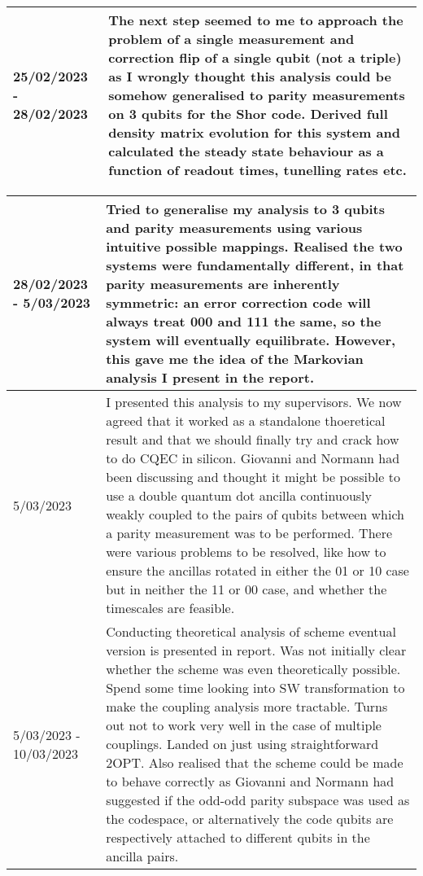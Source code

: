 \documentclass{article}
\begin{document}
\begin{table}
\begin{tabular}{|p{2cm}|p{10cm}|}
    \hline 25/02/2023 - 28/02/2023&
    The next step seemed to me to approach the problem of a single measurement and correction flip of a single qubit (not a triple) as I wrongly thought this analysis could be somehow generalised to parity measurements on 3 qubits for the Shor code. Derived full density matrix evolution for this system and calculated the steady state behaviour as a function of readout times, tunelling rates etc. \\ \hline

\end{tabular}
\end{table}
\begin{table}
\centering
\begin{tabular}{|p{2cm}|p{10cm}|}
    \hline 28/02/2023 - 5/03/2023& Tried to generalise my analysis to 3 qubits and parity measurements using various intuitive possible mappings. Realised the two systems were fundamentally different, in that parity measurements are inherently symmetric: an error correction code will always treat 000 and 111 the same, so the system will eventually equilibrate. However, this gave me the idea of the Markovian analysis I present in the report. \\
    \hline 5/03/2023&I presented this analysis to my supervisors. We now agreed that it worked as a standalone thoeretical result and that we should finally try and crack how to do CQEC in silicon. Giovanni and Normann had been discussing and thought it might be possible to use a double quantum dot ancilla continuously weakly coupled to the pairs of qubits between which a parity measurement was to be performed. There were various problems to be resolved, like how to ensure the ancillas rotated in either the 01 or 10 case but in neither the 11 or 00 case, and whether the timescales are feasible.\\
    \hline 5/03/2023 - 10/03/2023&
    Conducting theoretical analysis of scheme eventual version is presented in report. Was not initially clear whether the scheme was even theoretically possible. Spend some time looking into SW transformation to make the coupling analysis more tractable. Turns out not to work very well in the case of multiple couplings. Landed on just using straightforward 2OPT. Also realised that the scheme could be made to behave correctly as Giovanni and Normann had suggested if the odd-odd parity subspace was used as the codespace, or alternatively the code qubits are respectively attached to different qubits in the ancilla pairs.\\

\end{tabular}
\end{table}
\end{document}
